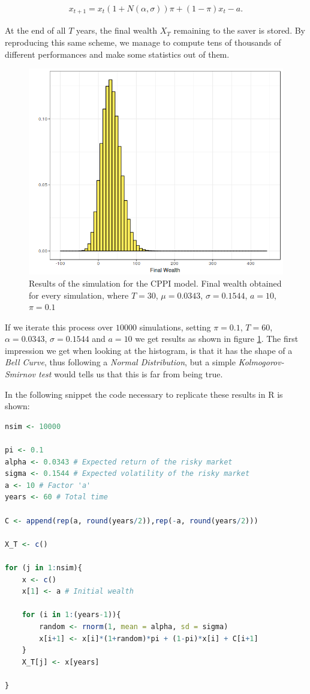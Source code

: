 \begin{align}
	x_{t+1} = x_{t}(1+N(\alpha, \sigma))\pi + (1 - \pi)x_{t} - a \textit{.}
\end{align}

At the end of all $T$ years, the final wealth $X_T$ remaining to the saver is stored. By reproducing this same scheme, we manage to compute tens of thousands of different performances and make some statistics out of them.

\begin{figure}[H]
    \centering
    \includegraphics[scale=0.65]{./images/fw_cppi.png}
    \caption{Results of the simulation for the CPPI model. Final wealth obtained for every simulation, where $T=30$, $\mu = 0.0343$, $\sigma = 0.1544$, $a=10$, $\pi = 0.1$}
    \label{fig:cppi_fw}
\end{figure}

If we iterate this process over $10000$ simulations, setting $\pi = 0.1$, $T = 60$, $\alpha = 0.0343$, $\sigma = 0.1544$ and $a = 10$ we get results as shown in figure \ref{fig:cppi_fw}. The first impression we get when looking at the histogram, is that it has the shape of a \textit{Bell Curve}, thus following a \textit{Normal Distribution}, but a simple \textit{Kolmogorov-Smirnov test} would tells us that this is far from being true.


In the following snippet the code necessary to replicate these results in R is shown:
\begin{lstlisting}[language = R]
nsim <- 10000

pi <- 0.1
alpha <- 0.0343 # Expected return of the risky market
sigma <- 0.1544 # Expected volatility of the risky market
a <- 10 # Factor 'a'
years <- 60 # Total time

C <- append(rep(a, round(years/2)),rep(-a, round(years/2)))

X_T <- c()

for (j in 1:nsim){
	x <- c()
	x[1] <- a # Initial wealth

	for (i in 1:(years-1)){
		random <- rnorm(1, mean = alpha, sd = sigma)
		x[i+1] <- x[i]*(1+random)*pi + (1-pi)*x[i] + C[i+1]
	}
	X_T[j] <- x[years]

}
\end{lstlisting}